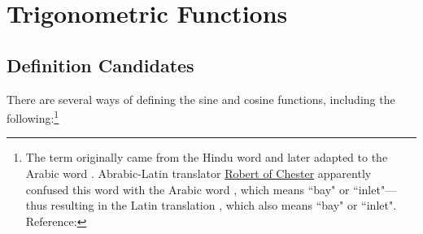 
\chapter{Trigonometric Functions}

\section{Definition Candidates}

There are several ways of defining the sine and cosine functions, including the following:\footnote{
  The term  originally came from the Hindu word  and
  later adapted to the Arabic word . 
  Abrabic-Latin translator 
  \href{http://en.wikipedia.org/wiki/Robert_of_Chester}{Robert of Chester} 
  apparently confused this word  with the Arabic word ,
  which means ``bay" or ``inlet"---
  thus resulting in the Latin translation , which also means ``bay" or ``inlet".
  Reference: %
  }

